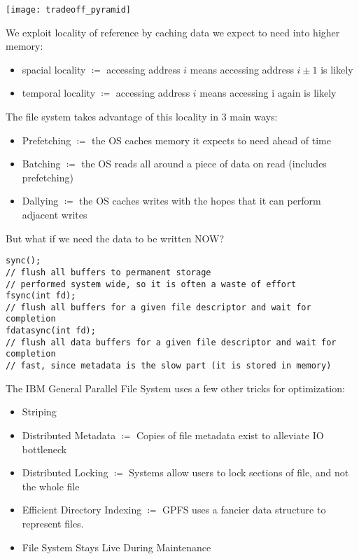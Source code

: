 \documentclass[../../lecture_notes.tex]{subfiles}
\begin{document}
\begin{minipage}{0.5\linewidth}
\texttt{[image: tradeoff\_pyramid]}
\end{minipage}%
\begin{minipage}{0.5\linewidth}
We exploit locality of reference by caching data we expect to need into higher memory:
\begin{itemize}[nosep]
	\item spacial locality $\coloneqq$ accessing address $i$ means accessing address $i \pm 1$ is likely
	\item temporal locality $\coloneqq$ accessing address $i$ means accessing i again is likely
\end{itemize}
\end{minipage}

The file system takes advantage of this locality in 3 main ways:
\begin{itemize}
\item Prefetching $\coloneqq$ the OS caches memory it expects to need ahead of time
\item Batching $\coloneqq$ the OS reads all around a piece of data on read (includes prefetching)
\item Dallying $\coloneqq$ the OS caches writes with the hopes that it can perform adjacent writes
\end{itemize}

But what if we need the data to be written NOW?
\begin{lstlisting}
sync();
// flush all buffers to permanent storage
// performed system wide, so it is often a waste of effort
fsync(int fd);
// flush all buffers for a given file descriptor and wait for completion
fdatasync(int fd);
// flush all data buffers for a given file descriptor and wait for completion
// fast, since metadata is the slow part (it is stored in memory)
\end{lstlisting}


The IBM General Parallel File System uses a few other tricks for optimization:
\begin{itemize}
\item Striping
\item Distributed Metadata $\coloneqq$ Copies of file metadata exist to alleviate IO bottleneck
\item Distributed Locking $\coloneqq$ Systems allow users to lock sections of file, and not the whole file
\item Efficient Directory Indexing $\coloneqq$ GPFS uses a fancier data structure to represent files.
\item File System Stays Live During Maintenance
\end{itemize}
\end{document}
